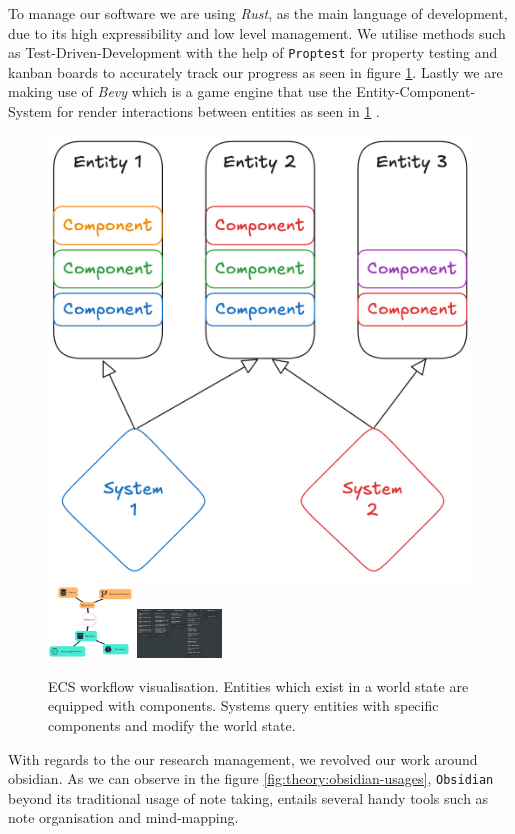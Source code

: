 To manage our software we are using \textit{Rust},
as the main language of development, due to its high expressibility and low level management.
We utilise methods such as Test-Driven-Development with the help of \texttt{Proptest}
for property testing and kanban boards to accurately track our progress as seen
in figure \ref{fig:soft:ecs-workflow}. Lastly we are making use of 
\textit{Bevy} which is a game engine that use the Entity-Component-System
for render interactions between entities as seen in \ref{fig:soft:ecs-workflow} \cite{bevyengine}.


\begin{figure}[h!]
    \centering
    \includegraphics[width=0.2\linewidth]{assets/ECS-visualisatoin.png}
    \includegraphics[width=0.2\textwidth]{assets/research-visualisation.png}
    \includegraphics[width=0.2\textwidth]{assets/kanban-board.png}
    \caption{ECS workflow visualisation. Entities which exist in a world state are equipped with components.
    Systems query entities with specific components and modify the world state.}
    \label{fig:soft:ecs-workflow}
\end{figure}

With regards to the our research management, we revolved our work around obsidian.
As we can observe in the figure \ref{fig:theory:obsidian-usages}, 
\texttt{Obsidian} beyond its traditional usage of note taking, entails several handy tools such as note organisation and mind-mapping.




